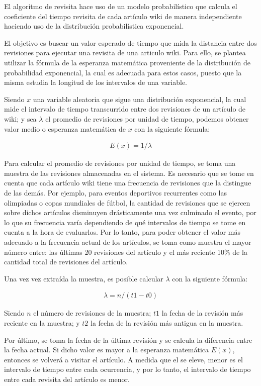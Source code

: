 El algoritmo de revisita hace uso de un modelo probabilístico que calcula el coeficiente del tiempo revisita de cada artículo wiki de manera independiente haciendo uso de la distribución probabilística exponencial.

El objetivo es buscar un valor esperado de tiempo que mida la distancia entre dos revisiones para ejecutar una revisita de una articulo wiki.
Para ello, se plantea utilizar la fórmula de la esperanza matemática proveniente de la distribución de probabilidad exponencial, la cual es adecuada para estos casos, puesto que la misma estudia la longitud de los intervalos de una variable.

Siendo $x$  una variable aleatoria que sigue una distribución exponencial, la cual mide el intervalo de tiempo transcurrido entre dos revisiones de un artículo de wiki;
y sea $\lambda$ el promedio de revisiones por unidad de tiempo, podemos obtener valor medio o esperanza  matemática de $x$ con la siguiente fórmula:

\begin{gather*}
E(x) = 1 / \lambda
\end{gather*}

Para calcular el promedio de revisiones por unidad de tiempo, se toma una muestra de las revisiones almacenadas en el sistema.
Es necesario que se tome en cuenta que cada artículo wiki tiene una frecuencia de revisiones que la distingue de las demás.
Por ejemplo, para eventos deportivos recurrentes como las olimpiadas o copas mundiales de fútbol, la cantidad de revisiones que se ejercen sobre dichos artículos disminuyen drásticamente una vez culminado el evento, por lo que su frecuencia varía dependiendo de qué intervalos de tiempo se tome en cuenta a la hora de evaluarlos.
Por lo tanto, para poder obtener el valor más adecuado a la frecuencia actual de los artículos, se toma como muestra el mayor número entre: las últimas 20 revisiones del artículo y el más reciente 10\% de la cantidad total de revisiones del artículo.

Una vez vez extraída la muestra, es posible calcular $\lambda$ con la siguiente fórmula:

\begin{gather*}
\lambda = n / (t1 - t0)
\end{gather*}

Siendo $n$ el número de revisiones de la muestra;
$t1$ la fecha de la revisión más reciente en la muestra;
y $t2$ la fecha de la revisión más antigua en la muestra.

Por último, se toma la fecha de la última revisión y se calcula la diferencia entre la fecha actual.
Si dicho valor es mayor a la esperanza matemática $E(x)$, entonces se volverá a visitar el artículo.
A medida que el  se eleve, menor es el intervalo de tiempo entre cada ocurrencia, y por lo tanto, el intervalo de tiempo entre cada revisita del artículo es menor.

